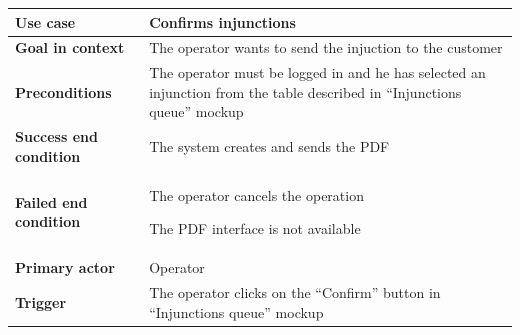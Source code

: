 {{{			\begin{center}
			\begin{tabular}{|p{4cm}|p{10cm}|}
			\hline
				\centering \vspace{1mm} \bfseries{Use case} \vspace{1mm} & 
				\vspace{1mm} Confirms injunctions\vspace{1mm}\\
			\hline
				\centering \vspace{1mm} \bfseries{Goal in context} \vspace{1mm} & 
				\vspace{1mm} The operator wants to send the injuction to the customer \vspace{1mm}\\
			\hline
				\centering \vspace{1mm} \bfseries{Preconditions} \vspace{1mm} & 
				\vspace{1mm} The operator must be logged in and he has selected an injunction from the table described in “Injunctions queue” mockup\vspace{1mm}\\
			\hline
				\centering \vspace{1mm} \bfseries{Success end condition} \vspace{1mm} & 
				\vspace{1mm} The system creates and sends the PDF\vspace{1mm}\\
			\hline
				\centering \vspace{1mm} \bfseries{Failed end condition} \vspace{1mm} & 
				\vspace{1mm} The operator cancels the operation 

				The PDF interface is not available \vspace{1mm}\\
			\hline
				\centering \vspace{1mm} \bfseries{Primary actor} \vspace{1mm} & 
				\vspace{1mm} Operator \vspace{1mm}\\
			\hline
				\centering \vspace{1mm} \bfseries{Trigger} \vspace{1mm} & 
				\vspace{1mm} The operator clicks on the “Confirm” button in “Injunctions queue” mockup \vspace{1mm}\\
			\hline
			\end{tabular}


\end{center}}}}
